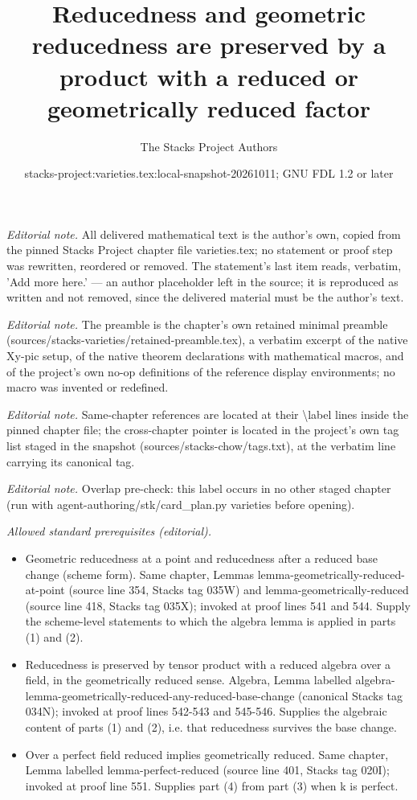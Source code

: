 \documentclass[10pt,a4paper]{amsart}
\title{Reducedness and geometric reducedness are preserved by a product with a reduced or geometrically reduced factor}
\author{The Stacks Project Authors}
\date{stacks-project:varieties.tex:local-snapshot-20261011; GNU FDL 1.2 or later}
\theoremstyle{plain}
\theoremstyle{definition}
\theoremstyle{remark}
\numberwithin{equation}{subsection}
\begin{document}
\maketitle
\noindent\textit{Editorial note.} All delivered mathematical text is the author's own, copied from the pinned Stacks Project chapter file varieties.tex; no statement or proof step was rewritten, reordered or removed. The statement's last item reads, verbatim, 'Add more here.' — an author placeholder left in the source; it is reproduced as written and not removed, since the delivered material must be the author's text.\par\medskip
\noindent\textit{Editorial note.} The preamble is the chapter's own retained minimal preamble (sources/stacks-varieties/retained-preamble.tex), a verbatim excerpt of the native Xy-pic setup, of the native theorem declarations with mathematical macros, and of the project's own no-op definitions of the reference display environments; no macro was invented or redefined.\par\medskip
\noindent\textit{Editorial note.} Same-chapter references are located at their \textbackslash{}label lines inside the pinned chapter file; the cross-chapter pointer is located in the project's own tag list staged in the snapshot (sources/stacks-chow/tags.txt), at the verbatim line carrying its canonical tag.\par\medskip
\noindent\textit{Editorial note.} Overlap pre-check: this label occurs in no other staged chapter (run with agent-authoring/stk/card\_plan.py varieties before opening).\par\medskip
\noindent\textit{Allowed standard prerequisites (editorial).}\begin{itemize}
\item Geometric reducedness at a point and reducedness after a reduced base change (scheme form). Same chapter, Lemmas lemma-geometrically-reduced-at-point (source line 354, Stacks tag 035W) and lemma-geometrically-reduced (source line 418, Stacks tag 035X); invoked at proof lines 541 and 544. Supply the scheme-level statements to which the algebra lemma is applied in parts (1) and (2).
\item Reducedness is preserved by tensor product with a reduced algebra over a field, in the geometrically reduced sense. Algebra, Lemma labelled algebra-lemma-geometrically-reduced-any-reduced-base-change (canonical Stacks tag 034N); invoked at proof lines 542-543 and 545-546. Supplies the algebraic content of parts (1) and (2), i.e. that reducedness survives the base change.
\item Over a perfect field reduced implies geometrically reduced. Same chapter, Lemma labelled lemma-perfect-reduced (source line 401, Stacks tag 020I); invoked at proof line 551. Supplies part (4) from part (3) when k is perfect.
\end{itemize}\medskip
\end{document}
